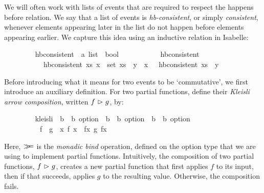 \documentclass[acmlarge,review,anonymous]{acmart}\settopmatter{printfolios=true}
\begin{document}
We will often work with lists of events that are required to respect the happens before relation.
We say that a list of events  is \emph{hb-consistent}, or simply \emph{consistent}, whenever elements appearing later in the list do not happen before elements appearing earlier.
We capture this idea using an inductive relation in Isabelle:
\\
\begin{isabellebody}
\ \ \ \ \ \ \ \  hb{\isacharunderscore}consistent\ {\isacharcolon}{\isacharcolon}\ {\isachardoublequoteopen}{\isacharprime}a\ list\ {\isasymRightarrow}\ bool{\isachardoublequoteclose}\ \isanewline
\ \ \ \ \ \ \ \ \ \ {\isachardoublequoteopen}hb{\isacharunderscore}consistent\ {\isacharbrackleft}{\isacharbrackright}{\isachardoublequoteclose}\ {\isacharbar}\isanewline
\ \ \ \ \ \ \ \ \ \ {\isachardoublequoteopen}{\isasymlbrakk}\ hb{\isacharunderscore}consistent\ xs{\isacharsemicolon}\ {\isasymforall}x\ {\isasymin}\ set\ xs{\isachardot}\ {\isasymnot}\ y\ {\isasymprec}\ x\ {\isasymrbrakk}\ {\isasymLongrightarrow}\ hb{\isacharunderscore}consistent\ {\isacharparenleft}xs\ {\isacharat}\ {\isacharbrackleft}y{\isacharbrackright}{\isacharparenright}{\isachardoublequoteclose}
\end{isabellebody}
\vspace{\baselineskip}
Before introducing what it means for two events to be `commutative', we first introduce an auxiliary definition.
For two partial functions, define their \emph{Kleisli arrow composition}, written $f\ {\isasymrhd}\ g$, by:
\\
\begin{isabellebody}
\ \ \ \ \ \ \ \  kleisli\ {\isacharcolon}{\isacharcolon}\ {\isachardoublequoteopen}{\isacharparenleft}{\isacharprime}b\ {\isasymRightarrow}\ {\isacharprime}b\ option{\isacharparenright}\ {\isasymRightarrow}\ {\isacharparenleft}{\isacharprime}b\ {\isasymRightarrow}\ {\isacharprime}b\ option{\isacharparenright}\ {\isasymRightarrow}\ {\isacharparenleft}{\isacharprime}b\ {\isasymRightarrow}\ {\isacharprime}b\ option{\isacharparenright}{\isachardoublequoteclose}\ {\isacharparenleft}\ {\isachardoublequoteopen}{\isasymrhd}{\isachardoublequoteclose}\ {}{}{\isacharparenright}\ \isanewline
\ \ \ \ \ \ \ \ \ \ {\isachardoublequoteopen}f\ {\isasymrhd}\ g\ {\isasymequiv}\ {\isasymlambda}x{\isachardot}\ f\ x\ {\isasymbind}\ {\isacharparenleft}{\isasymlambda}fx{\isachardot}\ g\ fx{\isacharparenright}{\isachardoublequoteclose}
\end{isabellebody}
\vspace{\baselineskip}
Here, $\emph{$\mathbin{>\!\!\!>\mkern-6.7mu=}$}$ is the \emph{monadic bind} operation, defined on the option type that we are using to implement partial functions.
Intuitively, the composition of two partial functions, $f\ {\isasymrhd}\ g$, creates a new partial function that first applies $f$ to its input, then if that succeeds, applies $g$ to the resulting value.
Otherwise, the composition fails.
\end{document}
